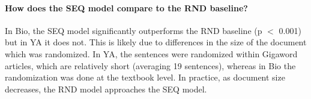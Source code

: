 
\paragraph{How does the SEQ model compare to the RND baseline?}
In Bio, the SEQ model significantly outperforms the RND baseline (p $<$ 0.001) but in YA it does not.  This is likely due to differences in the size of the document which was randomized.  In YA, the sentences were randomized within Gigaword articles, which are relatively short (averaging 19 sentences), whereas in Bio the randomization was done at the textbook level.  In practice, as document size decreases, the RND model approaches the SEQ model.


